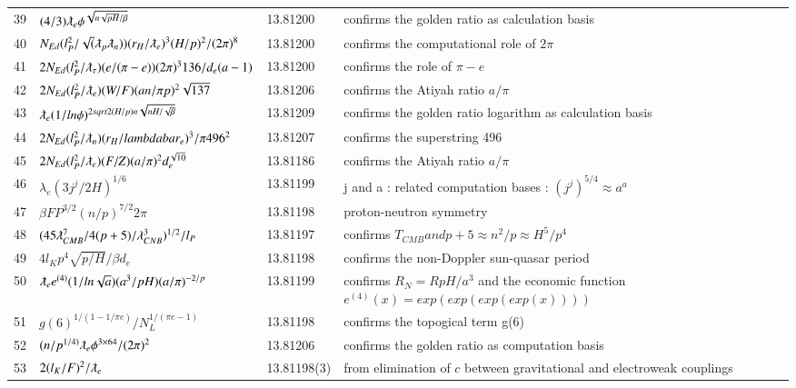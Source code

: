 \documentclass[a4paper,9pt]{article}
\begin{document}
\begin{appendix}
\begin{table}
\begin{tabular}{llll}
  39 & $ (4/3)\lambdabar_e \phi^{\sqrt {n\sqrt{pH}/\beta}} $ & 13.81200 & confirms the golden ratio as calculation basis \\ 
   40 & $N_{Ed}(l_P^2/\sqrt(\lambdabar_p \lambdabar_n)) (r_H/\lambdabar_e)^3 (H/p)^2 / (2\pi)^8  $ & 13.81200 & confirms the computational role of $2\pi$\\ 
   41 & $2N_{Ed}(l_P^2/\lambdabar_{\tau}) (e/(\pi-e)) (2\pi)^3 136/d_e(a-1) $ & 13.81200 & confirms the role of $\pi - e$\\
    42 & $2N_{Ed}(l_P^2/\lambdabar_e) (W/F) (an/\pi p)^2 \sqrt{137} $ & 13.81206 & confirms the Atiyah ratio $a/\pi$\\
    43 & $ \lambdabar_e (1/ln\phi)^{2sqrt {2(H/p)n\sqrt{nH/\sqrt\beta}}} $ & 13.81209 & confirms the golden ratio logarithm as calculation basis \\ 
   44 & $2N_{Ed}(l_P^2/\lambdabar_n) (r_H/lambdabar_e)^3/ \pi 496^2 $ & 13.81207 & confirms the superstring 496\\ 
   45 & $2N_{Ed}(l_P^2/\lambdabar_e) (F/Z) (a/\pi)^2 d_e^{\sqrt{10}} $ & 13.81186 & confirms the Atiyah ratio $a/\pi$\\  
   46 & $\lambda_{e} (3j^j/2H)^{1/6}$ & 13.81199 & j and a : related computation bases : $(j^j)^{5/4} \approx a^a$\\
   47 & $\beta F P^{3/2} (n/p)^{7/2} 2 \pi$ & 13.81198 & proton-neutron symmetry  \\ 
   48 & $(45\lambdabar_{CMB}^7/4(p+5)/\lambda_{CNB}^3)^{1/2}/l_P$ & 13.81197 & confirms $T_{CMB} and p+5 \approx n^2/p \approx H^5/p^4$\\
   49 & $4l_Kp^4 \sqrt{p/H}/\beta d_e$ & 13.81198 & confirms the non-Doppler sun-quasar period \\
   50 & $\lambdabar_{e} e^{(4)}(1/ln{\sqrt a}) (a^3/pH) (a/\pi)^{-2/p}   $ & 13.81199 & confirms $R_N = R pH/a^3$ and the economic function $e^{(4)}(x)= exp(exp(exp(exp(x))))$\\
   51 & $g(6)^{1/(1-1/\pi e)}/N_L^{1/(\pi e-1)}$ & 13.81198 & confirms the topogical term g(6) \\
    52 & $(n/p^{1/4)}  \lambdabar_{e} \phi ^{3\times 64}/(2\pi)^2   $ & 13.81206 & confirms the golden ratio as computation basis \\
   53 & $2(l_K/F)^2/\lambdabar_{e}$ & 13.81198(3) & from elimination of $c$ between gravitational and electroweak couplings \\
  
  
    \bottomrule
  \end{tabular}
\end{table}


\end{appendix}
\end{document}
